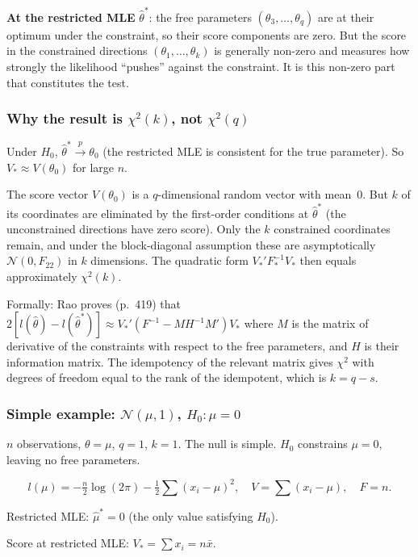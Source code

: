 \documentclass[a4paper,oneside,12pt]{extarticle}
\theoremstyle{plain}
\theoremstyle{definition}
\theoremstyle{remark}
\begin{document}
\textbf{At the restricted MLE} $\hat\theta^*$: the free parameters
$(\theta_3,\ldots,\theta_q)$ are at their optimum under the constraint,
so their score components are zero.  But the score in the constrained
directions $(\theta_1,\ldots,\theta_k)$ is generally non-zero and
measures how strongly the likelihood ``pushes'' against the constraint.
It is this non-zero part that constitutes the test.

\subsubsection*{Why the result is $\chi^2(k)$, not $\chi^2(q)$}

Under $H_0$, $\hat\theta^* \xrightarrow{p} \theta_0$ (the restricted
MLE is consistent for the true parameter).  So $V_* \approx V(\theta_0)$
for large $n$.

The score vector $V(\theta_0)$ is a $q$-dimensional random vector with
mean~$0$.  But $k$ of its coordinates are eliminated by the
first-order conditions at $\hat\theta^*$ (the unconstrained
directions have zero score).  Only the $k$ constrained coordinates
remain, and under the block-diagonal assumption these are
asymptotically $\mathcal{N}(0, F_{22})$ in $k$ dimensions.  The
quadratic form $V_*'F_*^{-1}V_*$ then equals approximately
$\chi^2(k)$.

Formally: Rao proves (p.~419) that $2[l(\hat\theta) - l(\hat\theta^*)]
\approx V_*'(F^{-1} - M H^{-1} M') V_*$ where $M$ is the matrix of
derivative of the constraints with respect to the free parameters,
and $H$ is their information matrix.  The idempotency of the
relevant matrix gives $\chi^2$ with degrees of freedom equal to
the rank of the idempotent, which is $k = q - s$.

\subsubsection*{Simple example: $\mathcal{N}(\mu,1)$, $H_0:\mu=0$}

$n$ observations, $\theta = \mu$, $q = 1$, $k = 1$.  The null is
simple.  $H_0$ constrains $\mu = 0$, leaving no free parameters.

\[
  l(\mu) = -\tfrac{n}{2}\log(2\pi) - \tfrac{1}{2}\sum(x_i-\mu)^2,
  \quad
  V = \sum(x_i-\mu), \quad F = n.
\]

Restricted MLE: $\hat\mu^* = 0$ (the only value satisfying $H_0$).

Score at restricted MLE: $V_* = \sum x_i = n\bar{x}$.
\end{document}
